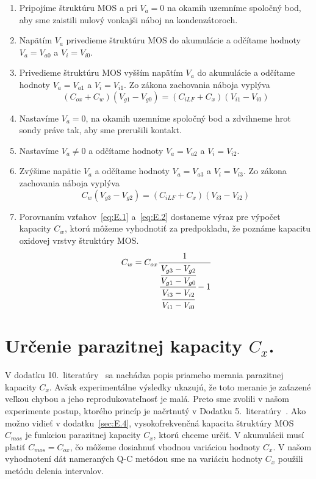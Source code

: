 \begin{enumerate}

\item Pripojíme štruktúru MOS a pri $V_a = 0$ na okamih uzemníme
  spoločný bod, aby sme zaistili nulový vonkajši náboj na
  kondenzátoroch.

\item Napätím $V_a$ privedieme štruktúru MOS do akumulácie a odčítame
  hodnoty $V_a = V_{a0}$ a $V_i = V_{i0}$.

\item Privedieme štruktúru MOS vyšším napätím $V_a$ do akumulácie a
  odčítame hodnoty $V_a = V_{a1}$ a $V_i = V_{i1}$. Zo zákona zachovania
  náboja vyplýva
  \begin{equation}\label{eq:E.1}
    (C_{ox} + C_w)(V_{g1} - V_{g0}) = (C_{iLF} + C_x)(V_{i1} - V_{i0})
  \end{equation}

\item Nastavíme $V_a=0$, na okamih uzemníme spoločný bod a zdvihneme
  hrot sondy práve tak, aby sme prerušili kontakt.

\item Nastavíme $V_a \neq 0$ a odčítame hodnoty $V_a = V_{a2}$ a $V_i =  V_{i2}$.

\item Zvýšime napätie $V_a$ a odčítame hodnoty $V_a = V_{a3}$ a $V_i =  V_{i3}$. Zo zákona zachovania náboja vyplýva
  \begin{equation}\label{eq:E.2}
    C_w (V_{g3} - V_{g2}) = (C_{iLF} + C_x)(V_{i3} - V_{i2})
  \end{equation}

\item Porovnaním vzťahov~\ref{eq:E.1} a~\ref{eq:E.2} dostaneme výraz
  pre výpočet kapacity $C_w$, ktorú môžeme vyhodnotiť za predpokladu,
  že poznáme kapacitu oxidovej vrstvy štruktúry MOS\@.
  \begin{equation}\label{eq:E.3}
    C_w = C_{ox} \cfrac{1} {\cfrac {\cfrac{V_{g3}-V_{g2}}{V_{g1}-V_{g0}}} {\cfrac{V_{i3}-V_{i2}}{V_{i1}-V_{i0}}} -1}
  \end{equation}

\end{enumerate}


\section{Určenie parazitnej kapacity $C_x$.}\label{sec:E.2}

V dodatku 10.\ literatúry~\cite{App.4} sa nachádza popis priameho
merania parazitnej kapacity $C_x$. Avšak experimentálne výsledky
ukazujú, že toto meranie je zaťazené veľkou chybou a jeho
reprodukovateľnosť je malá. Preto sme zvolili v našom experimente
postup, ktorého princíp je načrtnutý v Dodatku
5.\ literatúry~\cite{App.4}. Ako možno vidieť v dodatku~\ref{sec:E.4},
vysokofrekvenčná kapacita štruktúry MOS $C_{mos}$ je funkciou
parazitnej kapacity $C_x$, ktorú chceme určiť. V akumulácii musí
platiť $C_{mos} = C_{ox}$, čo môžeme dosiahnuť vhodnou variáciou
hodnoty $C_x$. V našom vyhodnotení dát nameraných Q-C metódou sme na
variáciu hodnoty $C_x$ použili metódu delenia intervalov.


